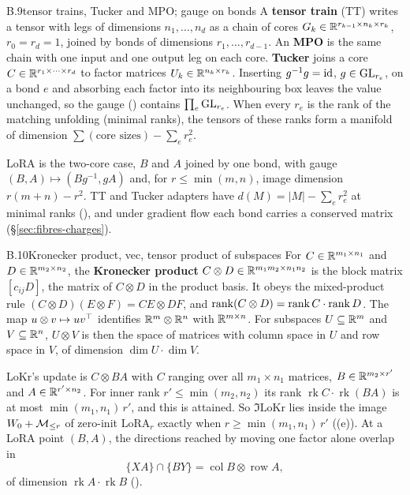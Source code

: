 \begin{bgentry}{B.9}{tensor trains, Tucker and MPO; gauge on bonds}
A \textbf{tensor train} (TT) writes a tensor with legs of dimensions $n_1,\dots,n_d$ as a chain of cores
$G_k\in\mathbb{R}^{r_{k-1}\times n_k\times r_k}$, $r_0=r_d=1$, joined by bonds of dimensions $r_1,\dots,r_{d-1}$. An
\textbf{MPO} is the same chain with one input and one output leg on each core. \textbf{Tucker} joins a core
$C\in\mathbb{R}^{r_1\times\cdots\times r_d}$ to factor matrices $U_k\in\mathbb{R}^{n_k\times r_k}$. Inserting $g^{-1}g=\mathrm{id}$,
$g\in\mathrm{GL}_{r_e}$, on a bond $e$ and absorbing each factor into its neighbouring box leaves the value unchanged, so the
gauge () contains $\prod_e\mathrm{GL}_{r_e}$. When every $r_e$ is the rank of the matching unfolding (minimal ranks),
the tensors of these ranks form a manifold of dimension $\sum(\text{core sizes})-\sum_er_e^2$.
\end{bgentry}

LoRA is the two-core case, $B$ and $A$ joined by one bond, with gauge $(B,A)\mapsto(Bg^{-1},gA)$ and, for
$r\le\min(m,n)$, image dimension $r(m+n)-r^2$. TT and Tucker adapters have $d(M)=\lvert M\rvert-\sum_er_e^2$ at minimal
ranks (), and under gradient flow each bond carries a conserved matrix
(\S\ref{sec:fibres-charges}).


\begin{bgentry}{B.10}{Kronecker product, vec, tensor product of subspaces}
For $C\in\mathbb{R}^{m_1\times n_1}$ and $D\in\mathbb{R}^{m_2\times n_2}$, the \textbf{Kronecker product}
$C\otimes D\in\mathbb{R}^{m_1m_2\times n_1n_2}$ is the block matrix $[c_{ij}D]$, the matrix of $C\otimes D$ in the product basis.
It obeys the mixed-product rule $(C\otimes D)(E\otimes F)=CE\otimes DF$, and $\operatorname{rank}(C\otimes D)=\operatorname{rank} C\cdot\operatorname{rank} D$. The map
$u\otimes v\mapsto uv^{\top}$ identifies $\mathbb{R}^m\otimes\mathbb{R}^n$ with $\mathbb{R}^{m\times n}$. For subspaces $U\subseteq\mathbb{R}^m$ and
$V\subseteq\mathbb{R}^n$, $U\otimes V$ is then the space of matrices with column space in $U$ and row space in $V$, of dimension
$\dim U\cdot\dim V$.
\end{bgentry}

LoKr's \citep{yeh2023navigating} update is $C\otimes BA$ with $C$ ranging over all $m_1\times n_1$ matrices,
$B\in\mathbb{R}^{m_2\times r'}$ and $A\in\mathbb{R}^{r'\times n_2}$. For inner rank $r'\le\min(m_2,n_2)$ its rank
$\operatorname{rk}C\cdot\operatorname{rk}(BA)$ is at most $\min(m_1,n_1)\,r'$, and this is attained. So
$\Im\mathrm{LoKr}$ lies inside the image $W_0+\mathcal{M}_{\le r}$ of zero-init $\mathrm{LoRA}_r$ exactly when $r\ge\min(m_1,n_1)\,r'$
((e)). At a LoRA point $(B,A)$, the directions reached by moving one factor alone overlap in
\begin{equation*}
  \{XA\}\cap\{BY\}=\operatorname{col}B\otimes\operatorname{row}A,
\end{equation*}
of dimension $\operatorname{rk}A\cdot\operatorname{rk}B$ ().

